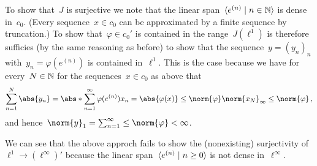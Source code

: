 To show that~$J$ is surjective we note that the linear span~$\gen{e^{(n)} \suchthat n \in \Natural}$ is dense in~$c_0$.
(Every sequence~$x \in c_0$ can be approximated by a finite sequence by truncation.)
To show that~$\varphi \in c_0'$ is contained in the range~$J(\ell^1)$ is therefore sufficies (by the same reasoning as before) to show that the sequence~$y = (y_n)_n$ with~$y_n = \varphi(e^{(n)})$ is contained in~$\ell^1$.
This is the case because we have for every~$N \in \mathbb{N}$ for the sequences~$x \in c_0$ as above that
\[
        \sum_{n=1}^N \abs{y_n}
  =     \abs*{ \sum_{n=1}^\infty \varphi(e^{(n)}) x_n }
  =     \abs{ \varphi(x) }
  \leq  \norm{\varphi} \norm{x_N}_\infty
  \leq  \norm{\varphi} \,,
\]
and hence~$\norm{y}_1 = \sum_{n=1}^\infty \leq \norm{\varphi} < \infty$.


\begin{remark}
  We can see that the above approch fails to show the (nonexisting) surjectivity of~$\ell^1 \to (\ell^\infty)'$ because the linear span~$\gen{e^{(n)} \suchthat n \geq 0}$ is not dense in~$\ell^\infty$.
\end{remark}




